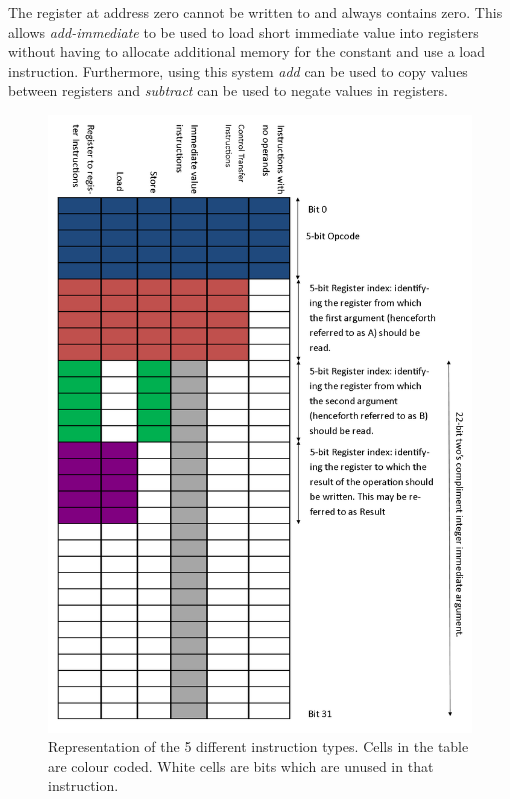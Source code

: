 \documentclass[11pt,a4paper]{IEEEtran}
\begin{document}
			The register at address zero cannot be written to and always contains zero. This allows \textit{add-immediate} to be used to load short immediate value into registers without having to allocate additional memory for the constant and use a load instruction. Furthermore, using this system \textit{add} can be used to copy values between registers and \textit{subtract} can be used to negate values in registers. 
			
			\begin{figure}[!ht]
				\includegraphics[scale=0.375]{InstructionBitmap.png}
				\caption{Representation of the 5 different instruction types. Cells in the table are colour coded. White cells are bits which are unused in that instruction.}
				\label{Fig:instructionBitmap}
			\end{figure}						
			
\end{document}
